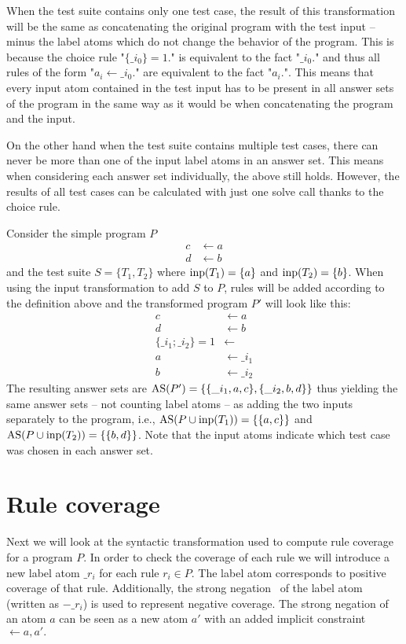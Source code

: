 When the test suite contains only one test case, the result of this transformation will be the same as concatenating the original program with the test input -- minus the label atoms which do not change the behavior of the program. This is because the choice rule "\(\{\_i_0\} = 1.\)" is equivalent to the fact "\(\_i_0.\)" and thus all rules of the form "\(a_i \leftarrow \_i_0.\)" are equivalent to the fact "\(a_i.\)". This means that every input atom contained in the test input has to be present in all answer sets of the program in the same way as it would be when concatenating the program and the input.

On the other hand when the test suite contains multiple test cases, there can never be more than one of the input label atoms in an answer set. This means when considering each answer set individually, the above still holds. However, the results of all test cases can be calculated with just one solve call thanks to the choice rule.

\begin{example}
\label{ex:input transformation}
    Consider the simple program $P$
    \begin{align*}
        c &\leftarrow a \\
        d &\leftarrow b
    \end{align*}
    and the test suite \(S = \{T_1, T_2\}\) where \(\operatorname{inp}(T_1) = \{a\}\) and \(\operatorname{inp}(T_2) = \{b\}\). When using the input transformation to add $S$ to $P$, rules will be added according to the definition above and the transformed program $P'$ will look like this:
    \begin{align*}
        c &\leftarrow a \\
        d &\leftarrow b \\
        \{\_i_1; \_i_2\} = 1 &\leftarrow \\
        a &\leftarrow \_i_1 \\
        b &\leftarrow \_i_2
    \end{align*}
    The resulting answer sets are \(\operatorname{AS}(P') = \{\{\_i_1, a, c\}, \{\_i_2, b, d\}\}\) thus yielding the same answer sets -- not counting label atoms -- as adding the two inputs separately to the program, i.e., \(\operatorname{AS}(P \cup \operatorname{inp}(T_1)) = \{\{a, c\}\}\) and \(\operatorname{AS}(P \cup \operatorname{inp}(T_2)) = \{\{b, d\}\}\). Note that the input atoms indicate which test case was chosen in each answer set.
\end{example}

\section{Rule coverage}
\label{sec:Computing coverage metrics for propositional programs/Rule coverage}
Next we will look at the syntactic transformation used to compute rule coverage for a program $P$. In order to check the coverage of each rule we will introduce a new label atom $\_r_i$ for each rule $r_i \in P$. The label atom corresponds to positive coverage of that rule. Additionally, the strong negation~\cite{GL91} of the label atom (written as $-\_r_i$) is used to represent negative coverage. The strong negation of an atom $a$ can be seen as a new atom $a'$ with an added implicit constraint $\leftarrow a, a'.$

